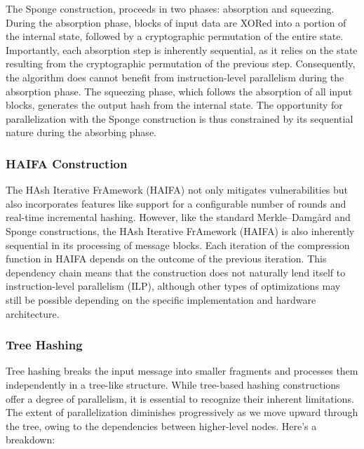 \documentclass[10pt]{article}
\begin{document}
The Sponge construction,  proceeds in two phases: absorption and squeezing.
During the absorption phase, blocks of input data are XORed into a portion of the internal state,
followed by a cryptographic permutation of the entire state. Importantly, each absorption step is inherently sequential,
as it relies on the state resulting from the cryptographic permutation of the previous step. Consequently,
the algorithm does cannot benefit from instruction-level parallelism during the absorption phase.
The squeezing phase, which follows the absorption of all input blocks, generates the output hash from the internal state.
The opportunity for parallelization with the Sponge construction is thus constrained by its sequential nature during the absorbing phase.

\subsubsection{HAIFA Construction}

The HAsh Iterative FrAmework (HAIFA) not only mitigates vulnerabilities but also incorporates features like support for a configurable number of rounds and real-time incremental hashing.
However, like the standard Merkle–Damgård and Sponge constructions, the HAsh Iterative FrAmework (HAIFA) is also inherently sequential in its processing of message blocks.
Each iteration of the compression function in HAIFA depends on the outcome of the previous iteration.
This dependency chain means that the construction does not naturally lend itself to instruction-level parallelism (ILP),
although other types of optimizations may still be possible depending on the specific implementation and hardware architecture.

\subsubsection{Tree Hashing}

Tree hashing breaks the input message into smaller fragments and processes them independently in a tree-like structure.
While tree-based hashing constructions offer a degree of parallelism, it is essential to recognize their inherent limitations. The extent of parallelization diminishes progressively as we move upward through the tree, owing to the dependencies between higher-level nodes. Here's a breakdown:
\end{document}
